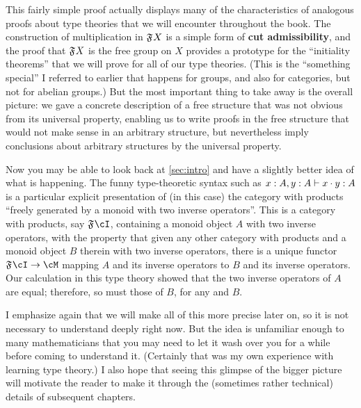 This fairly simple proof actually displays many of the characteristics of analogous proofs about type theories that we will encounter throughout the book.
The construction of multiplication in $\mathfrak{F}_{}X$ is a simple form of \textbf{cut admissibility}, and the proof that $\mathfrak{F}_{}X$ is the free group on $X$ provides a prototype for the ``initiality theorems'' that we will prove for all of our type theories.
(This is the ``something special'' I referred to earlier that happens for groups, and also for categories, but not for abelian groups.)
But the most important thing to take away is the overall picture: we gave a concrete description of a free structure that was not obvious from its universal property, enabling us to write proofs in the free structure that would not make sense in an arbitrary structure, but nevertheless imply conclusions about arbitrary structures by the universal property.

Now you may be able to look back at \cref{sec:intro} and have a slightly better idea of what is happening.
The funny type-theoretic syntax such as $x:A,y:A \vdash x\cdot y :A$ is a particular explicit presentation of (in this case) the category with products ``freely generated by a monoid with two inverse operators''.
This is a category with products, say $\F{}\cI$, containing a monoid object $A$ with two inverse operators, with the property that given any other category with products \cM and a monoid object $B$ therein with two inverse operators, there is a unique functor $\F{}\cI \to \cM$ mapping $A$ and its inverse operators to $B$ and its inverse operators.
Our calculation in this type theory showed that the two inverse operators of $A$ are equal; therefore, so must those of $B$, for any \cM and $B$.

I emphasize again that we will make all of this more precise later on, so it is not necessary to understand deeply right now.
But the idea is unfamiliar enough to many mathematicians that you may need to let it wash over you for a while before coming to understand it.
(Certainly that was my own experience with learning type theory.)
I also hope that seeing this glimpse of the bigger picture will motivate the reader to make it through the (sometimes rather technical) details of subsequent chapters.

